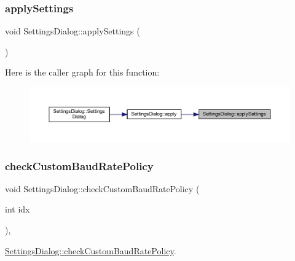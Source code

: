 \subsubsection{\texorpdfstring{applySettings}{applySettings}}
{\footnotesize\ttfamily void Settings\+Dialog\+::apply\+Settings (\begin{DoxyParamCaption}{ }\end{DoxyParamCaption})\hspace{0.3cm}{\ttfamily [signal]}}

Here is the caller graph for this function\+:
\nopagebreak
\begin{figure}[H]
\begin{center}
\leavevmode
\includegraphics[width=350pt]{class_settings_dialog_a20ba98dff60a58a8dd732eb4d061ea3f_icgraph}
\end{center}
\end{figure}
\mbox{\label{class_settings_dialog_aae0cd05c0c0204e11d9e4703ecf7b0a4}} 
\subsubsection{\texorpdfstring{checkCustomBaudRatePolicy}{checkCustomBaudRatePolicy}}
{\footnotesize\ttfamily void Settings\+Dialog\+::check\+Custom\+Baud\+Rate\+Policy (\begin{DoxyParamCaption}\item[{int}]{idx }\end{DoxyParamCaption})\hspace{0.3cm}{\ttfamily [private]}, {\ttfamily [slot]}}



\mbox{\hyperlink{class_settings_dialog_aae0cd05c0c0204e11d9e4703ecf7b0a4}{Settings\+Dialog\+::check\+Custom\+Baud\+Rate\+Policy}}. 


